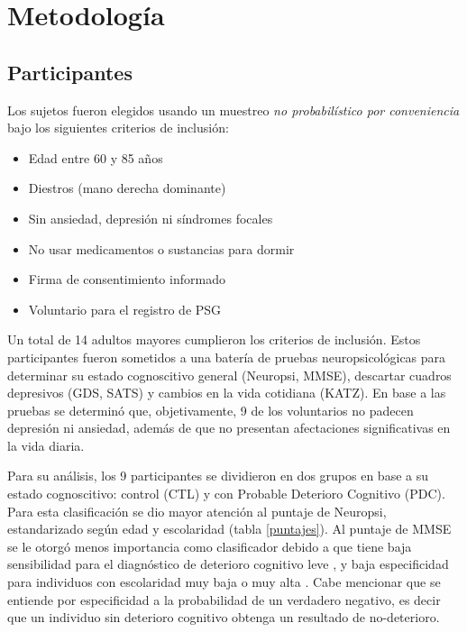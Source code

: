 \chapter{Metodología}


\section{Participantes}

Los sujetos fueron elegidos usando un muestreo \textit{no probabilístico por 
conveniencia} bajo los siguientes criterios de inclusión:
\begin{itemize}
\item Edad entre 60 y 85 años
\item Diestros (mano derecha dominante)
\item Sin ansiedad, depresión ni síndromes focales
\item No usar medicamentos o sustancias para dormir
\item Firma de consentimiento informado
\item Voluntario para el registro de PSG
\end{itemize}

Un total de 14 adultos mayores cumplieron los criterios de inclusión. Estos 
participantes fueron 
sometidos a una batería de pruebas neuropsicológicas para determinar su estado cognoscitivo general 
(Neuropsi, MMSE), descartar cuadros depresivos (GDS, SATS) y cambios en la vida cotidiana (KATZ).
En base a las pruebas se determinó que, objetivamente, 9 de los voluntarios no padecen depresión ni 
ansiedad, además de que no presentan afectaciones significativas en la vida diaria.

Para su análisis, los 9 participantes se dividieron en dos grupos en base a su estado cognoscitivo:
control (CTL) y con Probable Deterioro Cognitivo (PDC). 
Para esta clasificación se dio mayor atención al puntaje de Neuropsi, estandarizado 
según edad y escolaridad (tabla \ref{puntajes}). Al puntaje de MMSE se le otorgó menos importancia
como clasificador debido a que tiene baja sensibilidad para el diagnóstico de deterioro cognitivo 
leve \cite{Ardila12}, y baja especificidad para individuos con escolaridad muy baja o muy 
alta \cite{Ostrosky00}.
Cabe mencionar que se entiende por especificidad a la probabilidad de 
un verdadero negativo, es decir
que un individuo sin deterioro 
cognitivo obtenga un resultado de no-deterioro.

